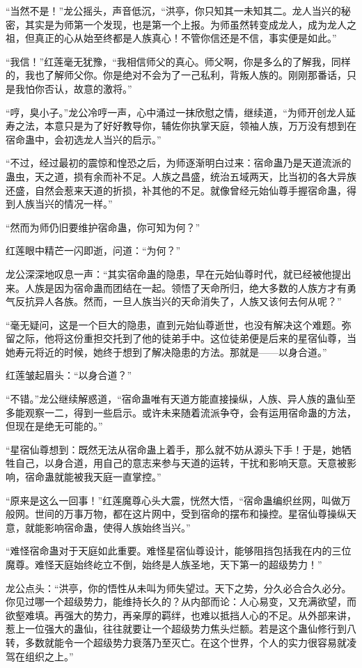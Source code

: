 \begin{this_body}
“当然不是！”龙公摇头，声音低沉，“洪亭，你只知其一未知其二。龙人当兴的秘密，其实是为师第一个发现，也是第一个上报。为师虽然转变成龙人，成为龙人之祖，但真正的心从始至终都是人族真心！不管你信还是不信，事实便是如此。”

“我信！”红莲毫无犹豫，“我相信师父的真心。师父啊，你是多么的了解我，同样的，我也了解师父你。你是绝对不会为了一己私利，背叛人族的。刚刚那番话，只是我怕你否认，故意的激将。”

“哼，臭小子。”龙公冷哼一声，心中涌过一抹欣慰之情，继续道，“为师开创龙人延寿之法，本意只是为了好好教导你，辅佐你执掌天庭，领袖人族，万万没有想到在宿命蛊中，会初选龙人当兴的启示。”

“不过，经过最初的震惊和惶恐之后，为师逐渐明白过来：宿命蛊乃是天道流派的蛊虫，天之道，损有余而补不足。人族之昌盛，统治五域两天，比当初的各大异族还盛，自然会惹来天道的折损，补其他的不足。就像曾经元始仙尊手握宿命蛊，得到人族当兴的情况一样。”

“然而为师仍旧要维护宿命蛊，你可知为何？”

红莲眼中精芒一闪即逝，问道：“为何？”

龙公深深地叹息一声：“其实宿命蛊的隐患，早在元始仙尊时代，就已经被他提出来。人族是因为宿命蛊而团结在一起。领悟了天命所归，绝大多数的人族方才有勇气反抗异人各族。然而，一旦人族当兴的天命消失了，人族又该何去何从呢？”

“毫无疑问，这是一个巨大的隐患，直到元始仙尊逝世，也没有解决这个难题。弥留之际，他将这份重担交托到了他的徒弟手中。这位徒弟便是后来的星宿仙尊，当她寿元将近的时候，她终于想到了解决隐患的方法。那就是——以身合道。”

红莲皱起眉头：“以身合道？”

“不错。”龙公继续解惑道，“宿命蛊唯有天道方能直接操纵，人族、异人族的蛊仙至多能观察一二，得到一些启示。或许未来随着流派争夺，会有运用宿命蛊的方法，但现在是绝无可能的。”

“星宿仙尊想到：既然无法从宿命蛊上着手，那么就不妨从源头下手！于是，她牺牲自己，以身合道，用自己的意志来参与天道的运转，干扰和影响天意。天意被影响，宿命蛊就能被我天庭一直掌控。”

“原来是这么一回事！”红莲魔尊心头大震，恍然大悟，“宿命蛊编织丝网，叫做万般网。世间的万事万物，都在这片网中，受到宿命的摆布和操控。星宿仙尊操纵天意，就能影响宿命蛊，使得人族始终当兴。”

“难怪宿命蛊对于天庭如此重要。难怪星宿仙尊设计，能够阻挡包括我在内的三位魔尊。难怪天庭始终屹立不倒，始终是人族圣地，天下第一的超级势力！”

龙公点头：“洪亭，你的悟性从未叫为师失望过。天下之势，分久必合合久必分。你见过哪一个超级势力，能维持长久的？从内部而论：人心易变，又充满欲望，而欲壑难填。再强大的势力，再亲厚的羁绊，也难以抵挡人心的不足。从外部来讲，惹上一位强大的蛊仙，往往就要让一个超级势力焦头烂额。若是这个蛊仙修行到八转，多数就能令一个超级势力衰落乃至灭亡。在这个世界，个人的实力很容易就凌驾在组织之上。”


\end{this_body}
